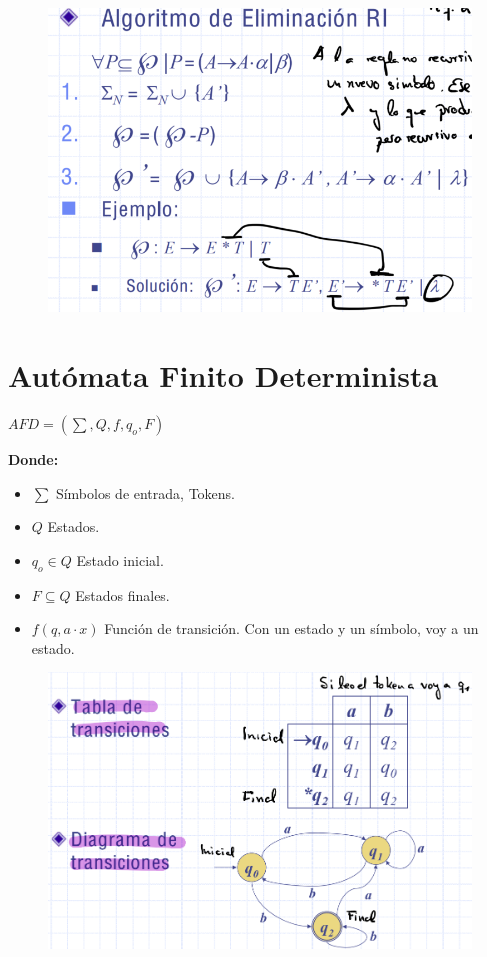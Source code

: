 \documentclass[12pt, twoside, openright]{report} %
\begin{document}
\begin{figure}[H]
	{\includegraphics[scale=.4]{Untitled 2.png}}
\end{figure}

\section{Autómata Finito Determinista}

\(AFD=( \sum, Q, f, q_o, F)\)

\textbf{Donde:}

\begin{itemize}
\item
  \(\sum\) Símbolos de entrada, Tokens.
\item
  \(Q\) Estados.
\item
  \(q_o \in Q\) Estado inicial.
\item
  \(F \subseteq Q\) Estados finales.
\item
  \(f(q,a \cdot x)\) Función de transición. Con un estado y un símbolo,
  voy a un estado.
\end{itemize}

\begin{figure}[H]
	{\includegraphics[scale=.25]{Untitled 3.png}}
\end{figure}
\end{document}
